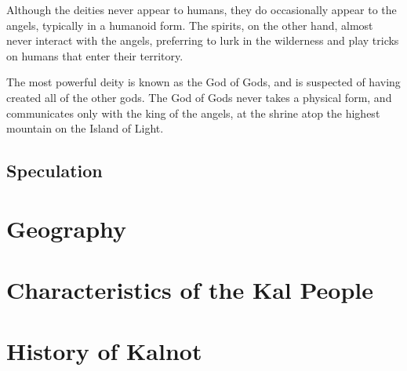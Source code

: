 \documentclass{article}
\begin{document}
Although the deities never appear to humans, they do occasionally appear to the angels, typically in a humanoid form. The spirits, on the other hand, almost never interact with the angels, preferring to lurk in the wilderness and play tricks on humans that enter their territory.

The most powerful deity is known as the God of Gods, and is suspected of having created all of the other gods. The God of Gods never takes a physical form, and communicates only with the king of the angels, at the shrine atop the highest mountain on the Island of Light.

\subsection{Speculation}

\section{Geography}

\section{Characteristics of the Kal People}

\section{History of Kalnot}
\end{document}
